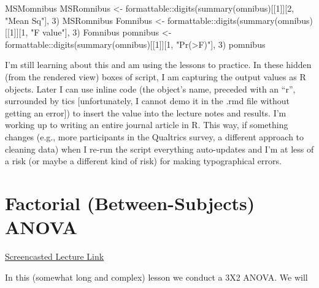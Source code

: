 \documentclass[
  11pt,
]{book}
\newenvironment{Shaded}{\begin{snugshade}}{\end{snugshade}}
\newcommand{\DecValTok}[1]{\textcolor[rgb]{0.00,0.00,0.81}{#1}}
\newcommand{\FunctionTok}[1]{\textcolor[rgb]{0.00,0.00,0.00}{#1}}
\newcommand{\NormalTok}[1]{#1}
\newcommand{\OtherTok}[1]{\textcolor[rgb]{0.56,0.35,0.01}{#1}}
\newcommand{\SpecialCharTok}[1]{\textcolor[rgb]{0.00,0.00,0.00}{#1}}
\newcommand{\StringTok}[1]{\textcolor[rgb]{0.31,0.60,0.02}{#1}}
\begin{document}
\begin{Shaded}
\begin{Highlighting}[]
\NormalTok{MSMomnibus}
\NormalTok{MSRomnibus }\OtherTok{\textless{}{-}}\NormalTok{ formattable}\SpecialCharTok{::}\FunctionTok{digits}\NormalTok{(}\FunctionTok{summary}\NormalTok{(omnibus)[[}\DecValTok{1}\NormalTok{]][}\DecValTok{2}\NormalTok{, }\StringTok{"Mean Sq"}\NormalTok{],}
    \DecValTok{3}\NormalTok{)}
\NormalTok{MSRomnibus}
\NormalTok{Fomnibus }\OtherTok{\textless{}{-}}\NormalTok{ formattable}\SpecialCharTok{::}\FunctionTok{digits}\NormalTok{(}\FunctionTok{summary}\NormalTok{(omnibus)[[}\DecValTok{1}\NormalTok{]][}\DecValTok{1}\NormalTok{, }\StringTok{"F value"}\NormalTok{], }\DecValTok{3}\NormalTok{)}
\NormalTok{Fomnibus}
\NormalTok{pomnibus }\OtherTok{\textless{}{-}}\NormalTok{ formattable}\SpecialCharTok{::}\FunctionTok{digits}\NormalTok{(}\FunctionTok{summary}\NormalTok{(omnibus)[[}\DecValTok{1}\NormalTok{]][}\DecValTok{1}\NormalTok{, }\StringTok{"Pr(\textgreater{}F)"}\NormalTok{], }\DecValTok{3}\NormalTok{)}
\NormalTok{pomnibus}
\end{Highlighting}
\end{Shaded}

I'm still learning about this and am using the lessons to practice. In these hidden (from the rendered view) boxes of script, I am capturing the output values as R objects. Later I can use inline code (the object's name, preceded with an ``r'', surrounded by tics {[}unfortunately, I cannot demo it in the .rmd file without getting an error{]}) to insert the value into the lecture notes and results. I'm working up to writing an entire journal article in R. This way, if something changes (e.g., more participants in the Qualtrics survey, a different approach to cleaning data) when I re-run the script everything auto-updates and I'm at less of a risk (or maybe a different kind of risk) for making typographical errors.

\hypertarget{between}{%
\chapter{Factorial (Between-Subjects) ANOVA}\label{between}}

\href{https://spu.hosted.panopto.com/Panopto/Pages/Viewer.aspx?pid=3bb1bee1-c2ac-4cda-95f2-ad8b0152132c}{Screencasted Lecture Link}

In this (somewhat long and complex) lesson we conduct a 3X2 ANOVA. We will
\end{document}
